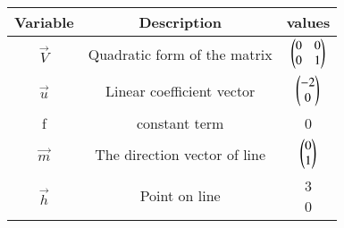 \begin{tabular}[12pt]{ |c| c| c |}
    \hline
    \textbf{Variable} & \textbf{Description} & \textbf{values}\\ 
    \hline
    $\vec{V}$ & Quadratic form of the matrix & $\begin{pmatrix}0 & 0 \\ 0 & 1\end{pmatrix} $\\
    \hline
    $\vec{u}$ & Linear coefficient vector & $\begin{pmatrix}-2 \\ 0\end{pmatrix} $\\
    \hline
    f & constant term & 0 \\ 
    \hline
    $\vec{m}$ & The direction vector of line & $\begin{pmatrix}0 \\ 1\end{pmatrix}$\\
    \hline
     $\vec{h}$ & Point on line & \myvec{3 \\ 0} \\
     \hline
\end{tabular}
